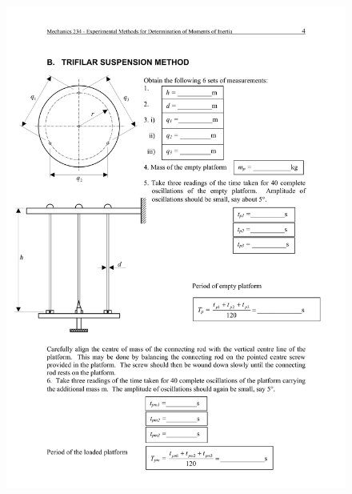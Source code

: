 \documentclass[12pt,a4paper]{report}
\begin{document}
\begin{figure}
 \includegraphics[width=\linewidth]{lab1/lab1-4}
  \caption*{}
\label{}
\end{figure}
\end{document}

